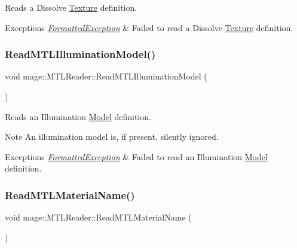 Reads a Dissolve \hyperlink{classmage_1_1_texture}{Texture} definition.


\begin{DoxyExceptions}{Exceptions}
{\em \hyperlink{structmage_1_1_formatted_exception}{Formatted\+Exception}} & Failed to read a Dissolve \hyperlink{classmage_1_1_texture}{Texture} definition. \\
\hline
\end{DoxyExceptions}
\hypertarget{classmage_1_1_m_t_l_reader_a77bbb659fe66e9bad451281dbd0c49d7}{}\label{classmage_1_1_m_t_l_reader_a77bbb659fe66e9bad451281dbd0c49d7} 
\subsubsection{\texorpdfstring{Read\+M\+T\+L\+Illumination\+Model()}{ReadMTLIlluminationModel()}}
{\footnotesize\ttfamily void mage\+::\+M\+T\+L\+Reader\+::\+Read\+M\+T\+L\+Illumination\+Model (\begin{DoxyParamCaption}{ }\end{DoxyParamCaption})\hspace{0.3cm}{\ttfamily [private]}}

Reads an Illumination \hyperlink{classmage_1_1_model}{Model} definition.

\begin{DoxyNote}{Note}
An illumination model is, if present, silently ignored. 
\end{DoxyNote}

\begin{DoxyExceptions}{Exceptions}
{\em \hyperlink{structmage_1_1_formatted_exception}{Formatted\+Exception}} & Failed to read an Illumination \hyperlink{classmage_1_1_model}{Model} definition. \\
\hline
\end{DoxyExceptions}
\hypertarget{classmage_1_1_m_t_l_reader_a53494ca5e0f905b97227b21711a1686a}{}\label{classmage_1_1_m_t_l_reader_a53494ca5e0f905b97227b21711a1686a} 
\subsubsection{\texorpdfstring{Read\+M\+T\+L\+Material\+Name()}{ReadMTLMaterialName()}}
{\footnotesize\ttfamily void mage\+::\+M\+T\+L\+Reader\+::\+Read\+M\+T\+L\+Material\+Name (\begin{DoxyParamCaption}{ }\end{DoxyParamCaption})\hspace{0.3cm}{\ttfamily [private]}}

